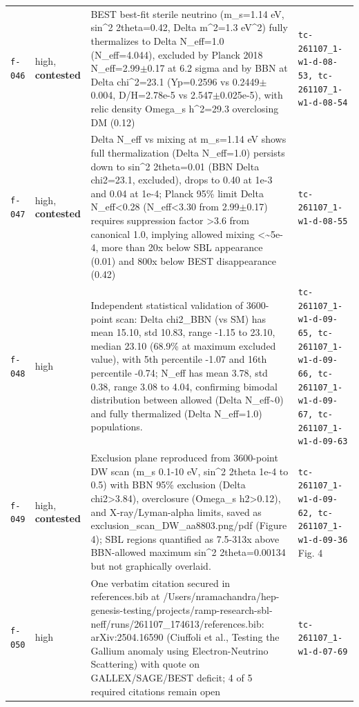 \documentclass[11pt,a4paper]{article}
\begin{document}
\begin{longtable}{@{}p{}p{}p{}p{}@{}}
\texttt{f-046} & high, \textbf{contested} & BEST best-fit sterile neutrino (m\_s=1.14 eV, sin\textasciicircum{}2 2theta=0.42, Delta m\textasciicircum{}2=1.3 eV\textasciicircum{}2) fully thermalizes to Delta N\_eff=1.0 (N\_eff=4.044), excluded by Planck 2018 N\_eff=2.99$\pm$0.17 at 6.2 sigma and by BBN at Delta chi\textasciicircum{}2=23.1 (Yp=0.2596 vs 0.2449$\pm$0.004, D/H=2.78e-5 vs 2.547$\pm$0.025e-5), with relic density Omega\_s h\textasciicircum{}2=29.3 overclosing DM (0.12) & \texttt{tc-261107\_\allowbreak{}1-w1-d-08-53,\allowbreak{} tc-261107\_\allowbreak{}1-w1-d-08-54} \\
\texttt{f-047} & high, \textbf{contested} & Delta N\_eff vs mixing at m\_s=1.14 eV shows full thermalization (Delta N\_eff=1.0) persists down to sin\textasciicircum{}2 2theta=0.01 (BBN Delta chi2=23.1, excluded), drops to 0.40 at 1e-3 and 0.04 at 1e-4; Planck 95\% limit Delta N\_eff\textless{}0.28 (N\_eff\textless{}3.30 from 2.99$\pm$0.17) requires suppression factor \textgreater{}3.6 from canonical 1.0, implying allowed mixing \textless{}\textasciitilde{}5e-4, more than 20x below SBL appearance (0.01) and 800x below BEST disappearance (0.42) & \texttt{tc-261107\_\allowbreak{}1-w1-d-08-55} \\
\texttt{f-048} & high & Independent statistical validation of 3600-point scan: Delta chi2\_BBN (vs SM) has mean 15.10, std 10.83, range -1.15 to 23.10, median 23.10 (68.9\% at maximum excluded value), with 5th percentile -1.07 and 16th percentile -0.74; N\_eff has mean 3.78, std 0.38, range 3.08 to 4.04, confirming bimodal distribution between allowed (Delta N\_eff\textasciitilde{}0) and fully thermalized (Delta N\_eff=1.0) populations. & \texttt{tc-261107\_\allowbreak{}1-w1-d-09-65,\allowbreak{} tc-261107\_\allowbreak{}1-w1-d-09-66,\allowbreak{} tc-261107\_\allowbreak{}1-w1-d-09-67,\allowbreak{} tc-261107\_\allowbreak{}1-w1-d-09-63} \\
\texttt{f-049} & high, \textbf{contested} & Exclusion plane reproduced from 3600-point DW scan (m\_s 0.1-10 eV, sin\textasciicircum{}2 2theta 1e-4 to 0.5) with BBN 95\% exclusion (Delta chi2\textgreater{}3.84), overclosure (Omega\_s h2\textgreater{}0.12), and X-ray/Lyman-alpha limits, saved as exclusion\_scan\_DW\_aa8803.png/pdf (Figure 4); SBL regions quantified as 7.5-313x above BBN-allowed maximum sin\textasciicircum{}2 2theta=0.00134 but not graphically overlaid. & \texttt{tc-261107\_\allowbreak{}1-w1-d-09-62,\allowbreak{} tc-261107\_\allowbreak{}1-w1-d-09-36} Fig. 4 \\
\texttt{f-050} & high & One verbatim citation secured in references.bib at /Users/nramachandra/hep-genesis-testing/projects/ramp-research-sbl-neff/runs/261107\_174613/references.bib: arXiv:2504.16590 (Ciuffoli et al., Testing the Gallium anomaly using Electron-Neutrino Scattering) with quote on GALLEX/SAGE/BEST deficit; 4 of 5 required citations remain open & \texttt{tc-261107\_\allowbreak{}1-w1-d-07-69} \\

\end{longtable}
\end{document}
